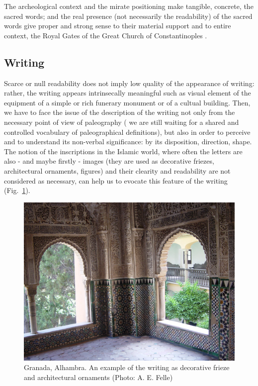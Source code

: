 \documentclass[amsthm,ebook]{saparticle}
\begin{document}
The archeological context and the mirate positioning make tangible, concrete, the sacred words; and the real presence
(not necessarily the readability) of the sacred words give proper and strong sense to their material support and to
entire context, the Royal Gates of the Great Church of Constantinoples \citep[320 and passim]{felle_esporre_2015}.




\subsection{Writing}


\noindent Scarce or null readability does not imply low quality of the appearance of writing: rather, the writing appears
intrinsecally meaningful such as visual element of the equipment of a simple or rich funerary monument or of a cultual
building. Then, we have to face the issue of the description of the writing not only from the necessary point of
view of paleography ( we are still waiting for a shared and controlled vocabulary of paleographical definitions), but
also in order to perceive and to understand its non-verbal significance: by its disposition, direction, shape. The
notion of the inscriptions in the Islamic world, where often the letters are also - and maybe firstly - images (they
are used as decorative friezes, architectural ornaments, figures) and their clearity and readability are not considered
as necessary, can help us to evocate this feature of the writing (Fig.~\ref{fig:10}).




\begin{figure}[!bp]
\centering
 \includegraphics[width=\columnwidth]{FelleVisualFeaturesofinscriptionsEAGLE2016FullPaper-img014.jpg}
\caption{Granada, Alhambra. An example of the writing as decorative frieze and architectural ornaments (Photo: A. E.
Felle)}
\label{fig:10}
\end{figure}
\end{document}
